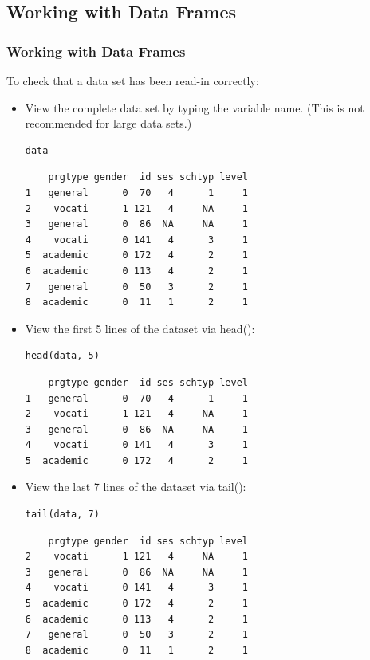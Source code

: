 \subsection{Working with Data Frames}
\begin{frame}
	\frametitle{Working with Data Frames}
	To check that a data set has been read-in correctly: 
	\begin{itemize}
		\item View the complete data set by typing the variable name.  (This is not recommended for large data sets.) 
\begin{lstlisting}
data
\end{lstlisting}

{ \small
\begin{verbatim}
    prgtype gender  id ses schtyp level
1   general      0  70   4      1     1
2    vocati      1 121   4     NA     1
3   general      0  86  NA     NA     1
4    vocati      0 141   4      3     1
5  academic      0 172   4      2     1
6  academic      0 113   4      2     1
7   general      0  50   3      2     1
8  academic      0  11   1      2     1
\end{verbatim}
}

\newpage		
		\item View the first 5 lines of the dataset via \ttfamily head(): \normalfont 
\begin{lstlisting}
head(data, 5) 
\end{lstlisting}

\begin{verbatim}
    prgtype gender  id ses schtyp level
1   general      0  70   4      1     1
2    vocati      1 121   4     NA     1
3   general      0  86  NA     NA     1
4    vocati      0 141   4      3     1
5  academic      0 172   4      2     1
\end{verbatim}

\newpage
		\item View the last 7 lines of the dataset via \ttfamily tail(): \normalfont 
\begin{lstlisting}
tail(data, 7)
\end{lstlisting}

\begin{verbatim}
    prgtype gender  id ses schtyp level
2    vocati      1 121   4     NA     1
3   general      0  86  NA     NA     1
4    vocati      0 141   4      3     1
5  academic      0 172   4      2     1
6  academic      0 113   4      2     1
7   general      0  50   3      2     1
8  academic      0  11   1      2     1
\end{verbatim}		


\end{itemize}
\end{frame}
